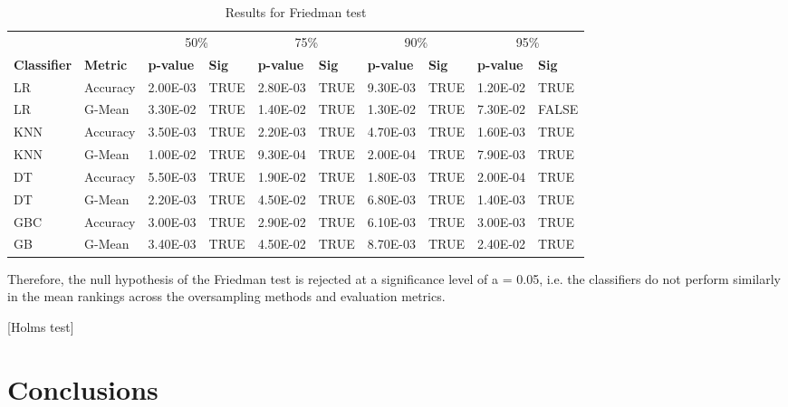 \documentclass[parskip=full]{scrartcl}
\begin{document}
\begin{table}[H]
	\begin{tabular}{ll|ll|ll|ll|ll}
		&          & \multicolumn{2}{c|}{50\%} & \multicolumn{2}{c|}{75\%} & 
		\multicolumn{2}{c|}{90\%} & \multicolumn{2}{c}{95\%} \\
		\textbf{Classifier} & \textbf{Metric}   & \textbf{p-value}  & 
		\textbf{Sig}  & \textbf{p-value}   & 
		\textbf{Sig}  & \textbf{p-value}   & \textbf{Sig}  & 
		\textbf{p-value}   & \textbf{Sig}  
		\\ \hline
		LR         & Accuracy & 2.00E-03  & TRUE          & 2.80E-03  & 
		TRUE          & 9.30E-03  & TRUE          & 1.20E-02  & TRUE          \\
		LR         & G-Mean   & 3.30E-02  & TRUE          & 1.40E-02  & 
		TRUE          & 1.30E-02  & TRUE          & 7.30E-02  & FALSE         \\
		KNN        & Accuracy & 3.50E-03  & TRUE          & 2.20E-03  & 
		TRUE          & 4.70E-03  & TRUE          & 1.60E-03  & TRUE          \\
		KNN        & G-Mean   & 1.00E-02  & TRUE          & 9.30E-04  & 
		TRUE          & 2.00E-04  & TRUE          & 7.90E-03  & TRUE          \\
		DT         & Accuracy & 5.50E-03  & TRUE          & 1.90E-02  & 
		TRUE          & 1.80E-03  & TRUE          & 2.00E-04  & TRUE          \\
		DT         & G-Mean   & 2.20E-03  & TRUE          & 4.50E-02  & 
		TRUE          & 6.80E-03  & TRUE          & 1.40E-03  & TRUE          \\
		GBC        & Accuracy & 3.00E-03  & TRUE          & 2.90E-02  & 
		TRUE          & 6.10E-03  & TRUE          & 3.00E-03  & TRUE          \\
		GB        & G-Mean   & 3.40E-03  & TRUE          & 4.50E-02  & 
		TRUE          & 8.70E-03  & TRUE          & 2.40E-02  & TRUE         
	\end{tabular}
\caption{\label{tab:friedman-test}Results for Friedman test}
\end{table}

Therefore, the null hypothesis of the Friedman test is rejected at a 
significance level of a = 0.05, i.e. the classifiers do not perform similarly 
in the mean rankings across the oversampling methods and evaluation metrics.

[Holms test]

\section{Conclusions}
\end{document}
